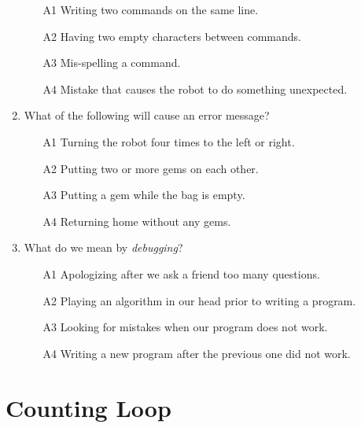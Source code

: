 \documentclass[article,A4,12pt]{llncs}
\begin{document}
\begin{enumerate}
\begin{enumerate}
\item[A1] Writing two commands on the same line.
\item[A2] Having two empty characters between commands.
\item[A3] Mis-spelling a command.  
\item[A4] Mistake that causes the robot to do something unexpected.
\end{enumerate}
\item What of the following will cause an error message?
\begin{enumerate}
\item[A1] Turning the robot four times to the left or right.
\item[A2] Putting two or more gems on each other.
\item[A3] Putting a gem while the bag is empty.
\item[A4] Returning home without any gems.
\end{enumerate}
\item What do we mean by {\em debugging}?
\begin{enumerate}
\item[A1] Apologizing after we ask a friend too many questions.
\item[A2] Playing an algorithm in our head prior to writing a program. 
\item[A3] Looking for mistakes when our program does not work.
\item[A4] Writing a new program after the previous one did not work.
\end{enumerate}
\end{enumerate}


\section{Counting Loop}
\end{document}
